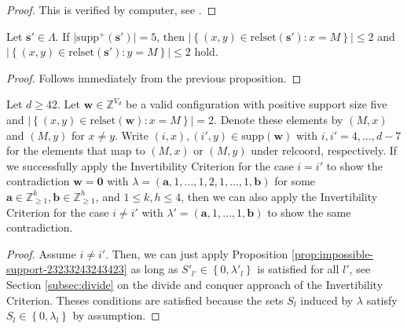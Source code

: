 \begin{proof}
    This is verified by computer, see \cite{ducrepo}.
\end{proof}

\begin{corollary}
    Let \( \mathbf{s}' \in \Lambda \). If \( \lvert \mathrm{supp}^+(\mathbf{s}') \rvert = 5 \), then \( \lvert \left\{ (x,y) \in \mathrm{relset}(\mathbf{s}') : x = M \right\} \rvert \leq 2 \) and \(  \lvert \left\{ (x,y) \in \mathrm{relset}(\mathbf{s}') : y = M \right\} \rvert \leq 2 \) hold.
\end{corollary}

\begin{proof}
    Follows immediately from the previous proposition.
\end{proof}

\begin{proposition}
    Let \( d\geq 42 \).
    Let \( \mathbf{w} \in \mathbb{Z}^{V_d} \) be a valid configuration with positive support size five and \( \lvert \left\{ (x,y) \in \mathrm{relset}(\mathbf{w}) : x = M \right\} \rvert = 2 \).
    Denote these elements by \( (M, x) \) and \( (M, y) \) for \( x \neq y \). Write \( (i,x), (i',y) \in \mathrm{supp}(\mathbf{w}) \) with \( i,i' = 4, \dots, d-7 \) for the elements that map to \( (M, x) \) or \( (M, y) \) under \( \mathrm{relcoord} \), respectively. If we successfully apply the Invertibility Criterion for the case \( i = i' \) to show the contradiction \( \mathbf{w} = \mathbf 0 \) with \( \lambda = (\mathbf{a},1,\dots,1, 2, 1, \dots, 1, \mathbf{b}) \)
    for some \(\mathbf{a} \in \mathbb{Z}^{k}_{\geq 1}, \mathbf{b} \in \mathbb{Z}^{h}_{\geq 1} \), and \( 1 \leq k,h \leq 4 \), then we can also apply the Invertibility Criterion for the case \( i \neq i' \) with \( \lambda' = (\mathbf{a},1, \dots, 1, \mathbf{b}) \)
    to show the same contradiction.
\end{proposition}

\begin{proof}
    Assume \( i \neq i' \). Then, we can just apply Proposition \ref{prop:impossible-support-23233243243423} as long as \( S'_{l'} \in \left\{ 0, \lambda'_l \right\} \) is satisfied for all \( l' \), see Section \ref{subsec:divide} on the divide and conquer approach of the Invertibility Criterion. Theses conditions are satisfied because the sets \( S_l \) induced by \( \lambda \) satisfy \( S_{l} \in \left\{ 0, \lambda_l \right\} \) by assumption.
\end{proof}

